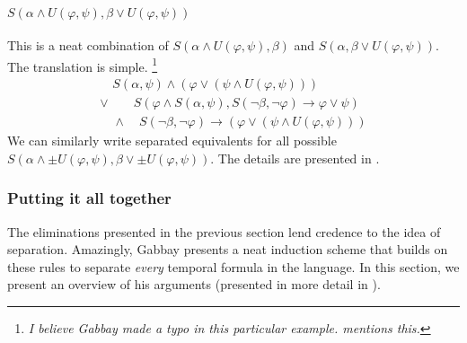 \documentclass[a4paper,UKenglish,cleveref, autoref, thm-restate, numberwithinsect]{lipics-v2021}
\begin{document}
\paragraph*{$S(\alpha \land U(\varphi,\psi), \beta \lor U(\varphi, \psi))$}
This is a neat combination of $S(\alpha \land U(\varphi, \psi), \beta)$ and $S(\alpha, \beta \lor U(\varphi, \psi))$. The translation is simple. \footnote{\textit{I believe Gabbay made a typo in this particular example. \cite{xpathComplete} mentions this.}}
\begin{equation*}
    \begin{aligned}
        \quad S(\alpha, \psi) \land (\varphi \lor (\psi \land U(\varphi, \psi))) \\
        \lor \quad \quad S(\varphi \land S(\alpha, \psi), S(\lnot \beta, \lnot \varphi) \to \varphi \lor \psi)\\
        \quad \land \quad S(\lnot \beta, \lnot \varphi) \to (\varphi \lor (\psi \land U(\varphi, \psi)))
    \end{aligned}
\end{equation*}
We can similarly write separated equivalents for all possible $S(\alpha \land \pm U(\varphi, \psi), \beta \lor \pm U(\varphi, \psi))$. The details are presented in \cite{gabbay1994, DecPastImpFuture89}.

\subsubsection{Putting it all together}

The eliminations presented in the previous section lend credence to the idea of separation. Amazingly, Gabbay presents a neat induction scheme that builds on these rules to separate \textit{every} temporal formula in the language. In this section, we present an overview of his arguments (presented in more detail in \cite{gabbay1994}).
\end{document}
